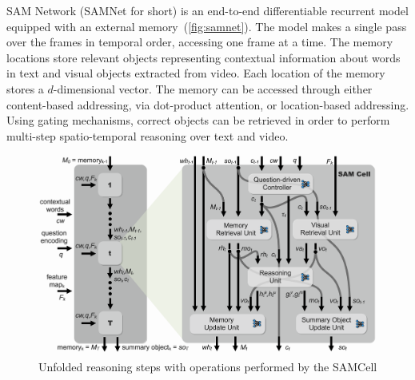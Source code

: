 
SAM Network (SAMNet for short) is an end-to-end differentiable recurrent model equipped with an external memory~(\cref{fig:samnet}).
The model makes a single pass over the frames in temporal order, accessing one frame at a time.
The memory locations store relevant objects representing contextual information about words in text and visual objects extracted from video. 
Each location of the memory stores a $d$-dimensional vector. %
The memory can be accessed through either content-based addressing, via dot-product attention, or location-based addressing. 
Using gating mechanisms, correct objects can be retrieved 
in order to perform multi-step spatio-temporal reasoning over text and video.  


\begin{figure}[htbp]
	\centering
	\includegraphics[width=\textwidth]{../img/architecture/samcell_reasoning}
	\caption{Unfolded reasoning steps with operations performed by the SAMCell}
	\label{fig:samcell}
\end{figure}


